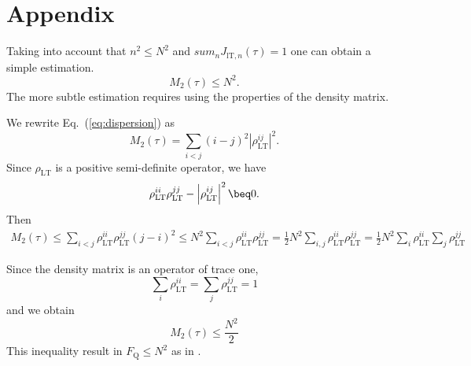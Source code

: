 \appendix
\section{Appendix}
Taking into account that $n^2 \leq N^2$ and $sum_n J_{\mathrm{lT}, n}(\tau)=1$ one can obtain a simple estimation. 
\begin{equation} 
    M_2(\tau) \leq N^2.
\end{equation}
The more subtle estimation requires using the properties of the density matrix.
\par 
We rewrite Eq.~(\ref{eq:dispersion}) as 
\begin{equation}
    M_2(\tau) = \sum\limits_{i < j}
    (i - j)^2 \left|\rho^{ij}_{\mathrm{LT}}\right|^2.
\end{equation}
Since $\rho_{\mathrm{LT}}$ is a positive semi-definite operator, we have 
\begin{equation}
    \rho_{\mathrm{LT}}^{ii}\rho_\mathrm{LT}^{jj} -
    \left|\rho^{ij}_{\mathrm{LT}}\right|^2 \beq 0.
\end{equation}
Then 
\begin{multline}
    M_2(\tau) \leq 
    \sum\limits_{i < j}
    \rho_{\mathrm{LT}}^{ii}\rho_{\mathrm{LT}}^{jj}
    (j - i)^2  \leq 
    N^2 \sum\limits_{i < j}
    \rho_{\mathrm{LT}}^{ii}\rho_{\mathrm{LT}}^{jj} = 
    \frac 1 2 N^2 \sum\limits_{i,j}
    \rho_{\mathrm{LT}}^{ii}\rho_{\mathrm{LT}}^{jj} = 
    \frac 1 2 N^2 
    \sum\limits_{i} \rho_{\mathrm{LT}}^{ii}
    \sum\limits_{j} \rho_{\mathrm{LT}}^{jj}
\end{multline}

Since the density matrix is an operator of trace one, 
\begin{equation}
	\sum\limits_{i} \rho_{\mathrm{LT}}^{ii} = 
	\sum\limits_{j} \rho_{\mathrm{LT}}^{jj} = 
	1
\end{equation}
and we obtain
\begin{equation}
	M_2(\tau) \leq \dfrac{N^2}{2}
\end{equation}
This inequality result in $F_\mathrm{Q} \leq N^2$ as in \cite{fisher_and_entanglement}.
